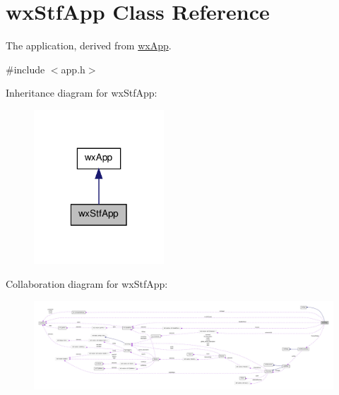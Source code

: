 \hypertarget{classwxStfApp}{
\section{wxStfApp Class Reference}
\label{classwxStfApp}
}


The application, derived from \hyperlink{classwxApp}{wxApp}.  




{\ttfamily \#include $<$app.h$>$}



Inheritance diagram for wxStfApp:
\nopagebreak
\begin{figure}[H]
\begin{center}
\leavevmode
\includegraphics[width=138pt]{classwxStfApp__inherit__graph}
\end{center}
\end{figure}


Collaboration diagram for wxStfApp:
\nopagebreak
\begin{figure}[H]
\begin{center}
\leavevmode
\includegraphics[width=400pt]{classwxStfApp__coll__graph}
\end{center}
\end{figure}
